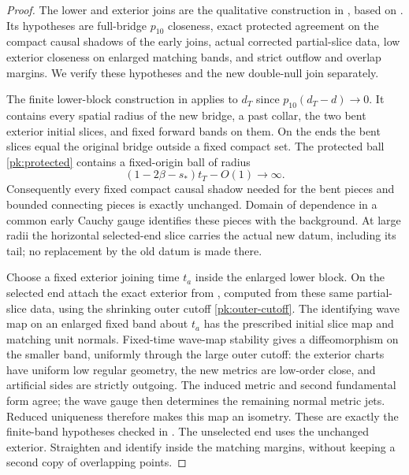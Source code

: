 \begin{proof}
The lower and exterior joins are the qualitative construction in
\cite[, ]{KerrCOne}, based on
\cite[, , ]{KerrCTwo}. Its hypotheses are full-bridge $p_{10}$
closeness, exact protected agreement on the compact causal
shadows of the early joins, actual corrected partial-slice data,
low exterior closeness on enlarged matching bands, and strict
outflow and overlap margins. We verify these hypotheses and the
new double-null join separately.

The finite lower-block construction in
\cite[]{KerrCTwo} applies to $d_T$ since
$p_{10}(d_T-d)\to0$. It contains every spatial radius of the new
bridge, a past collar, the two bent exterior initial slices, and
fixed forward bands on them. On the ends the bent slices equal
the original bridge outside a fixed compact set. The protected
ball \eqref{pk:protected} contains a fixed-origin ball of radius
\[
 (1-2\beta-s_*)t_T-O(1)\longrightarrow\infty.
\]
Consequently every fixed compact causal shadow needed for the
bent pieces and bounded connecting pieces is exactly unchanged.
Domain of dependence in a common early Cauchy gauge identifies
these pieces with the background. At large radii the horizontal
selected-end slice carries the actual new datum, including its
tail; no replacement by the old datum is made there.

Choose a fixed exterior joining time $t_a$ inside the enlarged
lower block. On the selected end attach the exact exterior from
, computed from these same
partial-slice data, using the shrinking outer cutoff
\eqref{pk:outer-cutoff}.
The identifying wave map on an enlarged fixed band about $t_a$
has the prescribed initial slice map and matching unit normals.
Fixed-time wave-map stability gives a diffeomorphism on the
smaller band, uniformly through the large outer cutoff: the
exterior charts have uniform low regular geometry, the new
metrics are low-order close, and artificial sides are strictly
outgoing. The induced metric and second fundamental form agree;
the wave gauge then determines the remaining normal metric jets.
Reduced uniqueness therefore makes this map an isometry. These
are exactly the finite-band hypotheses checked in
\cite[, ]{KerrCOne}. The unselected end uses the
unchanged exterior. Straighten and identify inside the matching
margins, without keeping a second copy of overlapping points.


\end{proof}
